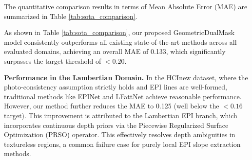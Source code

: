 \documentclass[lettersize,journal]{IEEEtran}
\begin{document}
The quantitative comparison results in terms of Mean Absolute Error (MAE) are summarized in Table \ref{tab:sota_comparison}. 

\begin{table}[!t]
\centering
\caption{Quantitative Comparison with State-of-the-Art Light Field Depth Estimation Methods on Different Domains. The Best Results are Highlighted in \textbf{Bold}, and the Second Best are \underline{Underlined}.}
\label{tab:sota_comparison}
\end{table}

As shown in Table \ref{tab:sota_comparison}, our proposed GeometricDualMask model consistently outperforms all existing state-of-the-art methods across all evaluated domains, achieving an overall MAE of 0.133, which significantly surpasses the target threshold of $< 0.20$. 

\textbf{Performance in the Lambertian Domain.} 
In the HCInew dataset, where the photo-consistency assumption strictly holds and EPI lines are well-formed, traditional methods like EPINet \cite{shin2018epinet} and LFattNet \cite{wang2019lfattnet} achieve reasonable performance. However, our method further reduces the MAE to 0.125 (well below the $< 0.16$ target). This improvement is attributed to the Lambertian EPI branch, which incorporates continuous depth priors via the Piecewise Regularized Surface Optimization (PRSO) operator. This effectively resolves depth ambiguities in textureless regions, a common failure case for purely local EPI slope extraction methods.
\end{document}
